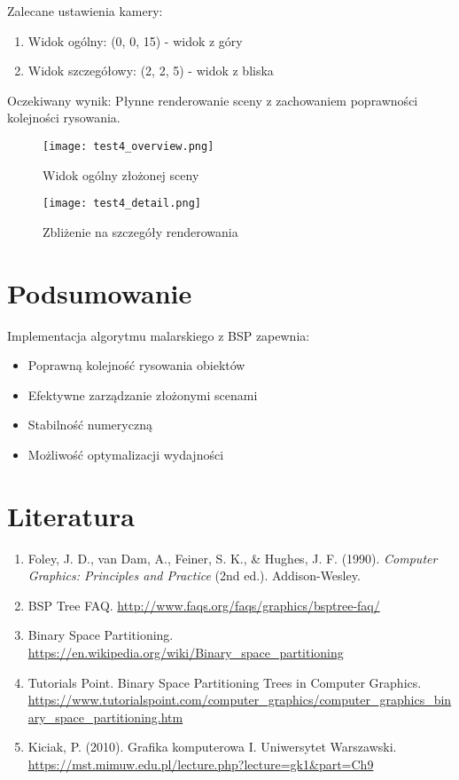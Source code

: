 \documentclass[a4paper,12pt]{article}
\begin{document}
Zalecane ustawienia kamery:
\begin{enumerate}
    \item Widok ogólny: (0, 0, 15) - widok z góry
    \item Widok szczegółowy: (2, 2, 5) - widok z bliska
\end{enumerate}

Oczekiwany wynik: Płynne renderowanie sceny z zachowaniem poprawności kolejności rysowania.

\begin{figure}[h]
    \centering
    \begin{minipage}{0.48\textwidth}
        \centering
        \texttt{[image: test4\_overview.png]}
        \caption{Widok ogólny złożonej sceny}
    \end{minipage}
    \hfill
    \begin{minipage}{0.48\textwidth}
        \centering
        \texttt{[image: test4\_detail.png]}
        \caption{Zbliżenie na szczegóły renderowania}
    \end{minipage}
\end{figure}

\section{Podsumowanie}

Implementacja algorytmu malarskiego z BSP zapewnia:
\begin{itemize}
    \item Poprawną kolejność rysowania obiektów
    \item Efektywne zarządzanie złożonymi scenami
    \item Stabilność numeryczną
    \item Możliwość optymalizacji wydajności
\end{itemize}

\section{Literatura}
\begin{enumerate}
    \item Foley, J. D., van Dam, A., Feiner, S. K., \& Hughes, J. F. (1990). \textit{Computer Graphics: Principles and Practice} (2nd ed.). Addison-Wesley.
    \item BSP Tree FAQ. \url{http://www.faqs.org/faqs/graphics/bsptree-faq/}
    \item Binary Space Partitioning. \url{https://en.wikipedia.org/wiki/Binary_space_partitioning}
    \item Tutorials Point. Binary Space Partitioning Trees in Computer Graphics. \url{https://www.tutorialspoint.com/computer_graphics/computer_graphics_binary_space_partitioning.htm}
    \item Kiciak, P. (2010). Grafika komputerowa I. Uniwersytet Warszawski. \url{https://mst.mimuw.edu.pl/lecture.php?lecture=gk1&part=Ch9}
\end{enumerate}
\end{document}
